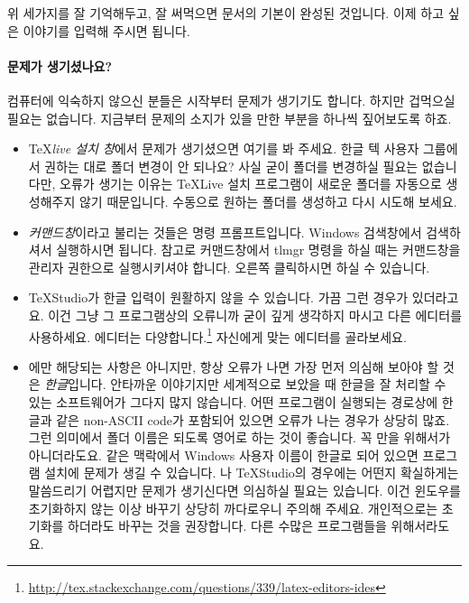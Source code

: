 위 세가지를 잘 기억해두고, 잘 써먹으면 \lt 문서의 기본이 완성된 것입니다. 이제 하고 싶은 이야기를 입력해 주시면 됩니다.

\paragraph{문제가 생기셨나요?}
\label{sec2:problem}
컴퓨터에 익숙하지 않으신 분들은 시작부터 문제가 생기기도 합니다.
하지만 겁먹으실 필요는 없습니다.
지금부터 문제의 소지가 있을 만한 부분을 하나씩 짚어보도록 하죠.
\begin{itemize}
	\item \TeX \emph{live 설치 창}에서 문제가 생기셨으면 여기를 봐 주세요.
	한글 텍 사용자 그룹에서 권하는 대로 폴더 변경이 안 되나요?
	사실 굳이 폴더를 변경하실 필요는 없습니다만, 오류가 생기는 이유는 \TeX Live 설치 프로그램이 새로운 폴더를 자동으로 생성해주지 않기 때문입니다.
	수동으로 원하는 폴더를 생성하고 다시 시도해 보세요.
	
	\item \emph{커맨드창}이라고 불리는 것들은 명령 프롬프트입니다.
	Windows 검색창에서 검색하셔서 실행하시면 됩니다.
	참고로 커맨드창에서 tlmgr 명령을 하실 때는 커맨드창을 관리자 권한으로 실행시키셔야 합니다.
	오른쪽 클릭하시면 하실 수 있습니다.
	
	\item TeXStudio가 한글 입력이 원활하지 않을 수 있습니다.
	가끔 그런 경우가 있더라고요.
	이건 그냥 그 프로그램상의 오류니까 굳이 깊게 생각하지 마시고 다른 에디터를 사용하세요.
	에디터는 다양합니다.\footnote{\url{http://tex.stackexchange.com/questions/339/latex-editors-ides}}
	자신에게 맞는 에디터를 골라보세요.
	
	\item \lt 에만 해당되는 사항은 아니지만, 항상 오류가 나면 가장 먼저 의심해 보아야 할 것은 \emph{한글}입니다.
	안타까운 이야기지만 세계적으로 보았을 때 한글을 잘 처리할 수 있는 소프트웨어가 그다지 많지 않습니다.
	어떤 프로그램이 실행되는 경로상에 한글과 같은 non-ASCII code가 포함되어 있으면 오류가 나는 경우가 상당히 많죠.
	그런 의미에서 폴더 이름은 되도록 영어로 하는 것이 좋습니다. 꼭 \lt 만을 위해서가 아니더라도요.
	같은 맥락에서 Windows 사용자 이름이 한글로 되어 있으면 프로그램 설치에 문제가 생길 수 있습니다.
	\lt 나 TeXStudio의 경우에는 어떤지 확실하게는 말씀드리기 어렵지만 문제가 생기신다면 의심하실 필요는 있습니다.
	이건 윈도우를 초기화하지 않는 이상 바꾸기 상당히 까다로우니 주의해 주세요.
	개인적으로는 초기화를 하더라도 바꾸는 것을 권장합니다.
	다른 수많은 프로그램들을 위해서라도요.
	

\end{itemize}
